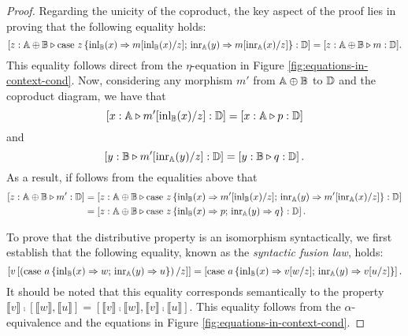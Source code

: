 \documentclass[10pt,a4paper]{amsart}
\theoremstyle{definition}
\theoremstyle{definition}
\theoremstyle{definition}
\theoremstyle{definition}
\theoremstyle{definition}
\theoremstyle{definition}
\begin{document}
\begin{proof}
  Regarding the unicity of the coproduct, the key aspect of the proof lies in proving that the following equality holds: 
  $$\left[z:\mathbb{A} \oplus \mathbb{B}  \triangleright \text{case } z \,\{\mathrm{inl}_{\mathbb{B}}(x) \Rightarrow m[\mathrm{inl}_{\mathbb{B}}(x)/ z] ; \, \mathrm{inr}_{\mathbb{A}}(y) \Rightarrow m[\mathrm{inr}_{\mathbb{A}}(x)/ z]\}: \mathbb{D}\right] = [z:\mathbb{A} \oplus \mathbb{B} \triangleright m: \mathbb{D}].$$ 
  This equality follows direct from the $\eta$-equation in Figure \ref{fig:equations-in-context-cond}. Now, considering any morphism $m'$ from $\mathbb{A} \oplus \mathbb{B}$ to $\mathbb{D}$ and the coproduct diagram, we have that 
  $$\left[ x: \mathbb{A} \triangleright m'[ \mathrm{inl}_{\mathbb{B}}(x)/z]: \mathbb{D}\right]  = \left[x: \mathbb{A}  \triangleright p: \mathbb{D}\right]  $$ 
  and
  $$\left[ y: \mathbb{B}  \triangleright m'[\mathrm{inr}_{\mathbb{A}}(y)/z]: \mathbb{D}\right] = \left[y: \mathbb{B}  \triangleright q: \mathbb{D}\right].$$
  As a result, if follows from the equalities above that 
  \begin{align*}
    \left[z:\mathbb{A} \oplus \mathbb{B}  \triangleright m': \mathbb{D}\right]& =\left[z:\mathbb{A} \oplus \mathbb{B}  \triangleright \text{case } z \,\{\mathrm{inl}_{\mathbb{B}}(x) \Rightarrow m'[\mathrm{inl}_{\mathbb{B}}(x)/ z] ; \, \mathrm{inr}_{\mathbb{A}}(y) \Rightarrow m'[\mathrm{inr}_{\mathbb{A}}(x)/ z]\}: \mathbb{D}\right]\\
    & = \left[z:\mathbb{A} \oplus \mathbb{B}  \triangleright \text{case } z \,\{\mathrm{inl}_{\mathbb{B}}(x) \Rightarrow p ; \, \mathrm{inr}_{\mathbb{A}}(y) \Rightarrow q\}: \mathbb{D}\right]. 
  \end{align*}
 
 
  To prove that the distributive property is an isomorphism syntactically, we first establish that the following equality, known  as the \emph{syntactic fusion law}, holds:
  \begin{equation*}
    \left[v\left[ \left(\text{case } a \,\{\mathrm{inl}_{\mathbb{B}}(x) \Rightarrow w ; \, \mathrm{inr}_{\mathbb{A}}(y) \Rightarrow u\}\right)  / z \right]\right] =   \left[\text{case } a \,\{\mathrm{inl}_{\mathbb{B}}(x) \Rightarrow v[w/z] ; \, \mathrm{inr}_{\mathbb{A}}(y) \Rightarrow v[u/z]\} \right].
  \end{equation*}
It should be noted that this equality corresponds semantically to the property  $ \llbracket v \rrbracket \comp [ \llbracket w \rrbracket,  \llbracket u \rrbracket] = [ \llbracket v \rrbracket \comp \llbracket w \rrbracket,\llbracket v \rrbracket \comp \llbracket u \rrbracket ] $.
This equality follows from the $\alpha$-equivalence and the equations in Figure \ref{fig:equations-in-context-cond}. 


\end{proof}
\end{document}
